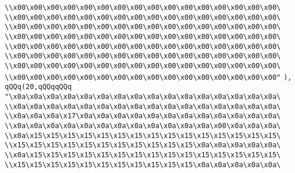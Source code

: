 \verb|\\x00\x00\x00\x00\x00\x00\x00\x00\x00\x00\x00\x00\x00\x00\x00\x00\|\newline
\verb|\\x00\x00\x00\x00\x00\x00\x00\x00\x00\x00\x00\x00\x00\x00\x00\x00\|\newline
\verb|\\x00\x00\x00\x00\x00\x00\x00\x00\x00\x00\x00\x00\x00\x00\x00\x00\|\newline
\verb|\\x00\x00\x00\x00\x00\x00\x00\x00\x00\x00\x00\x00\x00\x00\x00\x00\|\newline
\verb|\\x00\x00\x00\x00\x00\x00\x00\x00\x00\x00\x00\x00\x00\x00\x00\x00\|\newline
\verb|\\x00\x00\x00\x00\x00\x00\x00\x00\x00\x00\x00\x00\x00\x00\x00\x00\|\newline
\verb|\\x00\x00\x00\x00\x00\x00\x00\x00\x00\x00\x00\x00\x00\x00\x00\x00\|\newline
\verb|\\x00\x00\x00\x00\x00\x00\x00\x00\x00\x00\x00\x00\x00\x00\x00\x00"|\newline
\verb|),|\newline
\verb|qQQq(20,qQQqqQQq|\newline
\verb|"\x0a\x0a\x0a\x0a\x0a\x0a\x0a\x0a\x0a\x0a\x0a\x0a\x0a\x0a\x0a\x0a\|\newline
\verb|\\x0a\x0a\x0a\x0a\x0a\x0a\x0a\x0a\x0a\x0a\x0a\x0a\x0a\x0a\x0a\x0a\|\newline
\verb|\\x0a\x0a\x0a\x17\x0a\x0a\x0a\x0a\x0a\x0a\x0a\x0a\x0a\x0a\x0a\x0a\|\newline
\verb|\\x0a\x0a\x0a\x0a\x0a\x0a\x0a\x0a\x0a\x0a\x0a\x0a\x00\x0a\x0a\x0a\|\newline
\verb|\\x0a\x15\x15\x15\x15\x15\x15\x15\x15\x15\x15\x15\x15\x15\x15\x15\|\newline
\verb|\\x15\x15\x15\x15\x15\x15\x15\x15\x15\x15\x15\x0a\x0a\x0a\x0a\x0a\|\newline
\verb|\\x0a\x15\x15\x15\x15\x15\x15\x15\x15\x15\x15\x15\x15\x15\x15\x15\|\newline
\verb|\\x15\x15\x15\x15\x15\x15\x15\x15\x15\x15\x15\x0a\x0a\x0a\x0a\x0a\|\newline
